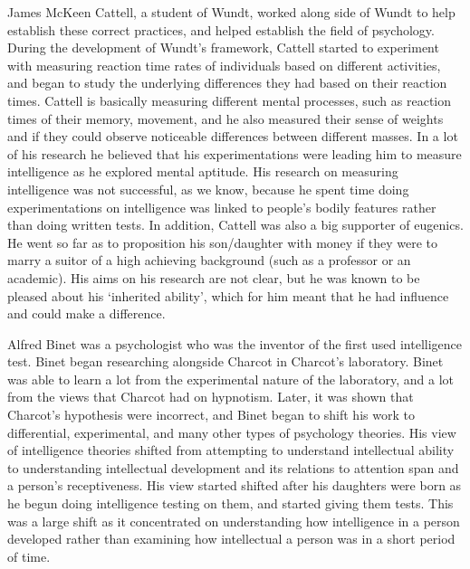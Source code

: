 \documentclass[12pt, oneside]{article}
\begin{document}
\par James McKeen Cattell, a student of Wundt, worked along side of Wundt to help establish these correct practices, and helped establish the field of psychology. During the development of Wundt's framework, Cattell started to experiment with measuring reaction time rates of individuals based on different activities, and began to study the underlying differences they had based on their reaction times. Cattell is basically measuring different mental processes, such as reaction times of their memory, movement, and he also measured their sense of weights and if they could observe noticeable differences between different masses. In a lot of his research he believed that his experimentations were leading him to measure intelligence as he explored mental aptitude. His research on measuring intelligence was not successful, as we know, because he spent time doing experimentations on intelligence was linked to people's bodily features rather than doing written tests. In addition, Cattell was also a big supporter of eugenics. He went so far as to proposition his son/daughter with money if they were to marry a suitor of a high achieving background (such as a professor or an academic). His aims on his research are not clear, but he was known to be pleased about his `inherited ability', which for him meant that he had influence and could make a difference.

\par Alfred Binet was a psychologist who was the inventor of the first used intelligence test. Binet began researching alongside Charcot in Charcot's laboratory. Binet was able to learn a lot from the experimental nature of the laboratory, and a lot from the views that Charcot had on hypnotism. Later, it was shown that Charcot's hypothesis were incorrect, and Binet began to shift his work to differential, experimental, and many other types of psychology theories. His view of intelligence theories shifted from attempting to understand intellectual ability to understanding intellectual development and its relations to attention span and a person's receptiveness. His view started shifted after his daughters were born as he begun doing intelligence testing on them, and started giving them tests. This was a large shift as it concentrated on understanding how intelligence in a person developed rather than examining how intellectual a person was in a short period of time.
\end{document}
